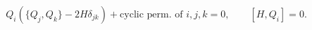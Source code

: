 \begin{equation}\label{psusy}
Q_i(\{Q_j,Q_k\}-2H\delta_{jk})+\mbox{cyclic perm. of }i,j,k  =0,
\qquad [H,Q_i]=0.
\end{equation}


